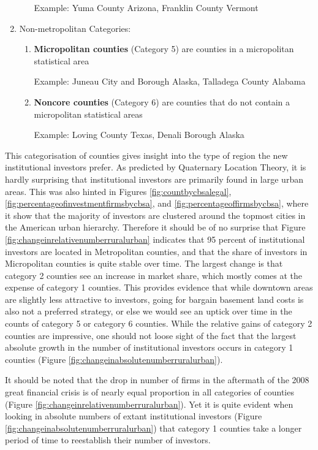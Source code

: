 \begin{enumerate}
\begin{enumerate}
		Example: Yuma County Arizona, Franklin County Vermont
		
	\end{enumerate}
	\item	Non-metropolitan Categories:
	\begin{enumerate}
		\item \textbf{Micropolitan counties} (Category 5) are counties in a micropolitan statistical area
		
		Example:  Juneau City and Borough Alaska, Talladega County Alabama
		
		\item \textbf{Noncore counties} (Category 6) are counties that do not contain a micropolitan statistical areas
		
		Example: Loving County Texas, Denali Borough Alaska
	\end{enumerate}
\end{enumerate}


This categorisation of counties gives insight into the type of region the new institutional investors prefer. As predicted by Quaternary Location Theory, it is hardly surprising that institutional investors are primarily found in large urban areas. This was also hinted in Figures \ref{fig:countbycbsalegal},  \ref{fig:percentageofinvestmentfirmsbycbsa}, and \ref{fig:percentageoffirmsbycbsa}, where it show that the majority of investors are clustered around the topmost cities in the American urban hierarchy.  Therefore it should be of no surprise that Figure \ref{fig:changeinrelativenumberruralurban} indicates that 95 percent of institutional investors are located in Metropolitan counties, and that the share of investors in Micropolitan counties is quite stable over time.  The largest change is that category 2 counties see an increase in market share, which mostly comes at the expense of category 1 counties. This provides evidence that while downtown areas are slightly less attractive to investors, going for bargain basement land costs is also not a preferred strategy, or else we would see an uptick over time in the counts of category 5 or category 6 counties.  While the relative gains of category 2 counties are impressive, one should not loose sight of the fact that the largest absolute growth in the number of institutional investors occurs in category 1 counties (Figure \ref{fig:changeinabsolutenumberruralurban}).     

It should be noted that the drop in number of firms in the aftermath of the 2008 great financial crisis is of nearly equal proportion in all categories of counties (Figure \ref{fig:changeinrelativenumberruralurban}).  Yet it is quite evident when looking in absolute numbers of extant institutional investors (Figure \ref{fig:changeinabsolutenumberruralurban}) that category 1 counties take a longer period of time to reestablish their number of investors.  

